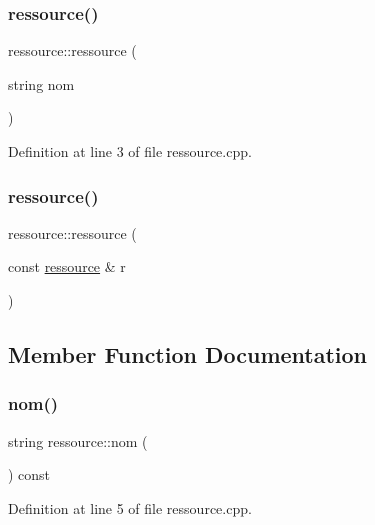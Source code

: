 \subsubsection{\texorpdfstring{ressource()}{ressource()}\hspace{0.1cm}{\footnotesize\ttfamily [1/2]}}
{\footnotesize\ttfamily ressource\+::ressource (\begin{DoxyParamCaption}\item[{string}]{nom }\end{DoxyParamCaption})}



Definition at line 3 of file ressource.\+cpp.

\hypertarget{classressource_adccfe979d5ccf07ae4f0cfa944e9f1b0}{}\label{classressource_adccfe979d5ccf07ae4f0cfa944e9f1b0} 
\subsubsection{\texorpdfstring{ressource()}{ressource()}\hspace{0.1cm}{\footnotesize\ttfamily [2/2]}}
{\footnotesize\ttfamily ressource\+::ressource (\begin{DoxyParamCaption}\item[{const \hyperlink{classressource}{ressource} \&}]{r }\end{DoxyParamCaption})\hspace{0.3cm}{\ttfamily [default]}}



\subsection{Member Function Documentation}
\hypertarget{classressource_aff712b6d732b3f4091dd29f4349aba85}{}\label{classressource_aff712b6d732b3f4091dd29f4349aba85} 
\subsubsection{\texorpdfstring{nom()}{nom()}}
{\footnotesize\ttfamily string ressource\+::nom (\begin{DoxyParamCaption}{ }\end{DoxyParamCaption}) const}



Definition at line 5 of file ressource.\+cpp.


